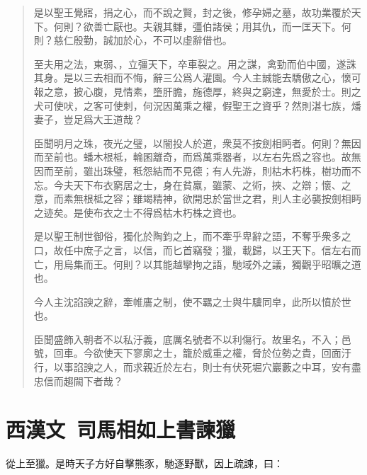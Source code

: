\begin{quotation}
是以聖王覺寤，捐之心，而不說之賢，封之後，修孕婦之墓，故功業覆於天下。何則？欲善亡厭也。夫親其讎，彊伯諸侯；用其仇，而一匡天下。何則？慈仁殷勤，誠加於心，不可以虛辭借也。

至夫用之法，東弱、，立彊天下，卒車裂之。用之謀，禽勁而伯中國，遂誅其身。是以三去相而不悔，辭三公爲人灌園。今人主誠能去驕傲之心，懷可報之意，披心腹，見情素，墮肝膽，施德厚，終與之窮達，無愛於士。則之犬可使吠，之客可使刺，何況因萬乘之權，假聖王之資乎？然則湛七族，燔妻子，豈足爲大王道哉？

臣聞明月之珠，夜光之璧，以闇投人於道，衆莫不按劍相眄者。何則？無因而至前也。蟠木根柢，輪囷離奇，而爲萬乘器者，以左右先爲之容也。故無因而至前，雖出珠璧，秪怨結而不見德；有人先游，則枯木朽株，樹功而不忘。今夫天下布衣窮居之士，身在貧羸，雖蒙、之術，挾、之辯；懷、之意，而素無根柢之容；雖竭精神，欲開忠於當世之君，則人主必襲按劍相眄之迹矣。是使布衣之士不得爲枯木朽株之資也。

是以聖王制世御俗，獨化於陶鈞之上，而不牽乎卑辭之語，不奪乎衆多之口，故任中庶子之言，以信，而匕首竊發；獵，載歸，以王天下。信左右而亡，用烏集而王。何則？以其能越攣拘之語，馳域外之議，獨觀乎昭曠之道也。

今人主沈諂諛之辭，牽帷廧之制，使不羈之士與牛驥同皁，此所以憤於世也。

臣聞盛飾入朝者不以私汙義，底厲名號者不以利傷行。故里名，不入；邑號，回車。今欲使天下寥廓之士，籠於威重之權，脅於位勢之貴，回面汙行，以事諂諛之人，而求親近於左右，則士有伏死堀穴巖藪之中耳，安有盡忠信而趨闕下者哉？
\end{quotation}
\vspace{-1em}
\theendnotes

\section[司馬相如上書諫獵\quad{\small 西漢文}]{{\normalsize 西漢文\ 司馬相如}\quad 上書諫獵}
從上至獵。是時天子方好自擊熊豕，馳逐野獸，因上疏諫，曰：

